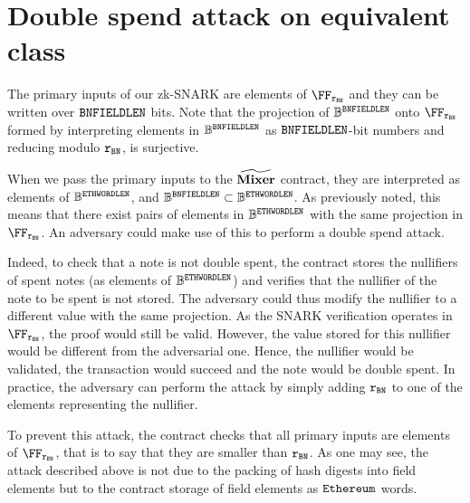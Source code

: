 \chapter{Double spend attack on equivalent class}\label{appendix:dbspd}

The primary inputs of our zk-SNARK are elements of $\FFx{\rBN}$ and they can be written over $\mathtt{BNFIELDLEN}$ bits. Note that the projection of $\mathbb{B}^{\mathtt{BNFIELDLEN}}$ onto $\FFx{\rBN}$ formed by interpreting elements in $\mathbb{B}^{\mathtt{BNFIELDLEN}}$ as $\mathtt{BNFIELDLEN}$-bit numbers and reducing modulo $\mathtt{r_{BN}}$, is surjective.

When we pass the primary inputs to the $\widetilde{\mathbf{Mixer}}$ contract, they are interpreted as elements of $\mathbb{B}^{\mathtt{ETHWORDLEN}}$, and $\mathbb{B}^{\mathtt{BNFIELDLEN}} \subset \mathbb{B}^{\mathtt{ETHWORDLEN}}$. As previously noted, this means that there exist pairs of elements in $\mathbb{B}^{\mathtt{ETHWORDLEN}}$ with the same projection in $\FFx{\rBN}$. An adversary could make use of this to perform a double spend attack.

Indeed, to check that a note is not double spent, the contract stores the nullifiers of spent notes (as elements of $\mathbb{B}^{\mathtt{ETHWORDLEN}}$) and verifies that the nullifier of the note to be spent is not stored. The adversary could thus modify the nullifier to a different value with the same projection. As the SNARK verification operates in $\FFx{\rBN}$, the proof would still be valid. However, the value stored for this nullifier would be different from the adversarial one. Hence, the nullifier would be validated, the transaction would succeed and the note would be double spent.
In practice, the adversary can perform the attack by simply adding $\mathtt{r_{BN}}$ to one of the elements representing the nullifier.

To prevent this attack, the contract checks that all primary inputs are elements of $\FFx{\rBN}$, that is to say that they are smaller than $\mathtt{r_{BN}}$.
As one may see, the attack described above is not due to the packing of hash digests into field elements but to the contract storage of field elements as $\texttt{Ethereum}$ words.
